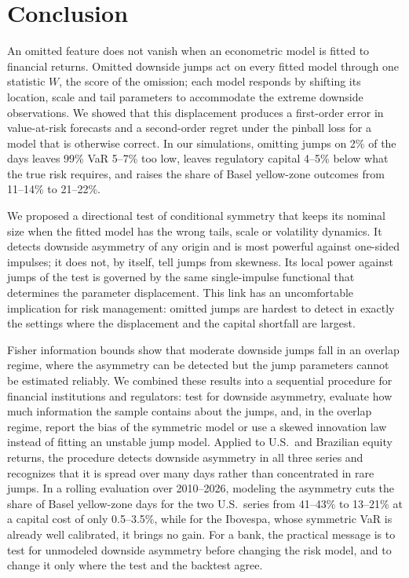 \documentclass[11pt,a4paper]{article}
\theoremstyle{definition}
\theoremstyle{remark}
\begin{document}
\section{Conclusion}\label{sec:conclusion}
An omitted feature does not vanish when an econometric model is fitted to financial returns. Omitted downside jumps act on every fitted model through one statistic $W$, the score of the omission; each model responds by shifting its location, scale and tail parameters to accommodate the extreme downside observations. We showed that this displacement produces a first-order error in value-at-risk forecasts and a second-order regret under the pinball loss for a model that is otherwise correct. In our simulations, omitting jumps on 2\% of the days leaves 99\% VaR 5--7\% too low, leaves regulatory capital 4--5\% below what the true risk requires, and raises the share of Basel yellow-zone outcomes from 11--14\% to 21--22\%.

We proposed a directional test of conditional symmetry that keeps its nominal size when the fitted model has the wrong tails, scale or volatility dynamics. It detects downside asymmetry of any origin and is most powerful against one-sided impulses; it does not, by itself, tell jumps from skewness. Its local power against jumps of the test is governed by the same single-impulse functional that determines the parameter displacement. This link has an uncomfortable implication for risk management: omitted jumps are hardest to detect in exactly the settings where the displacement and the capital shortfall are largest.

Fisher information bounds show that moderate downside jumps fall in an overlap regime, where the asymmetry can be detected but the jump parameters cannot be estimated reliably. We combined these results into a sequential procedure for financial institutions and regulators: test for downside asymmetry, evaluate how much information the sample contains about the jumps, and, in the overlap regime, report the bias of the symmetric model or use a skewed innovation law instead of fitting an unstable jump model. Applied to U.S.\ and Brazilian equity returns, the procedure detects downside asymmetry in all three series and recognizes that it is spread over many days rather than concentrated in rare jumps. In a rolling evaluation over 2010--2026, modeling the asymmetry cuts the share of Basel yellow-zone days for the two U.S.\ series from 41--43\% to 13--21\% at a capital cost of only 0.5--3.5\%, while for the Ibovespa, whose symmetric VaR is already well calibrated, it brings no gain. For a bank, the practical message is to test for unmodeled downside asymmetry before changing the risk model, and to change it only where the test and the backtest agree.
\end{document}
